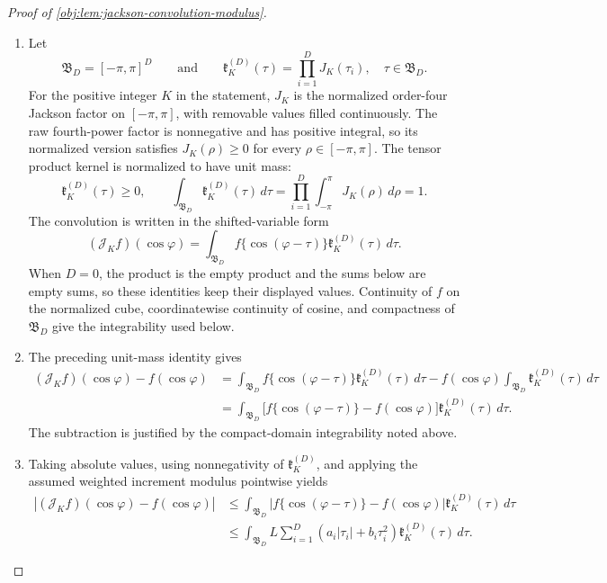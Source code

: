 \documentclass[11pt]{article}
\begin{document}
\begin{proof}[Proof of \cref{obj:lem:jackson-convolution-modulus}]
\begin{enumerate}
\item Let
\[
\mathfrak B_D=[-\pi,\pi]^D
\qquad\text{and}\qquad
\mathfrak k_K^{(D)}(\tau)=\prod_{i=1}^D J_K(\tau_i),
\quad \tau\in\mathfrak B_D .
\]
For the positive integer \(K\) in the statement, \(J_K\) is the normalized order-four Jackson factor on \([-\pi,\pi]\), with removable values filled continuously. The raw fourth-power factor is nonnegative and has positive integral, so its normalized version satisfies \(J_K(\rho)\ge0\) for every \(\rho\in[-\pi,\pi]\). The tensor product kernel is normalized to have unit mass:
\[
\mathfrak k_K^{(D)}(\tau)\ge0,
\qquad
\int_{\mathfrak B_D}\mathfrak k_K^{(D)}(\tau)\,d\tau
=
\prod_{i=1}^D\int_{-\pi}^{\pi}J_K(\rho)\,d\rho
=1.
\]
The convolution is written in the shifted-variable form
\[
(\mathcal J_K f)(\cos\varphi)
=
\int_{\mathfrak B_D}
f\{\cos(\varphi-\tau)\}\mathfrak k_K^{(D)}(\tau)\,d\tau .
\]
When \(D=0\), the product is the empty product and the sums below are empty sums, so these identities keep their displayed values. Continuity of \(f\) on the normalized cube, coordinatewise continuity of cosine, and compactness of \(\mathfrak B_D\) give the integrability used below. %

\item The preceding unit-mass identity gives
\[
\begin{aligned}
(\mathcal J_K f)(\cos\varphi)-f(\cos\varphi)
&=
\int_{\mathfrak B_D}
f\{\cos(\varphi-\tau)\}\mathfrak k_K^{(D)}(\tau)\,d\tau
-
f(\cos\varphi)
\int_{\mathfrak B_D}\mathfrak k_K^{(D)}(\tau)\,d\tau  \\
&=
\int_{\mathfrak B_D}
\bigl[
f\{\cos(\varphi-\tau)\}-f(\cos\varphi)
\bigr]\mathfrak k_K^{(D)}(\tau)\,d\tau .
\end{aligned}
\]
The subtraction is justified by the compact-domain integrability noted above. %

\item Taking absolute values, using nonnegativity of \(\mathfrak k_K^{(D)}\), and applying the assumed weighted increment modulus pointwise yields
\[
\begin{aligned}
\left|(\mathcal J_K f)(\cos\varphi)-f(\cos\varphi)\right|
&\le
\int_{\mathfrak B_D}
\left|f\{\cos(\varphi-\tau)\}-f(\cos\varphi)\right|
\mathfrak k_K^{(D)}(\tau)\,d\tau  \\
&\le
\int_{\mathfrak B_D}
L\sum_{i=1}^D\left(a_i|\tau_i|+b_i\tau_i^2\right)
\mathfrak k_K^{(D)}(\tau)\,d\tau .
\end{aligned}
\] %


\end{enumerate}
\end{proof}
\end{document}
